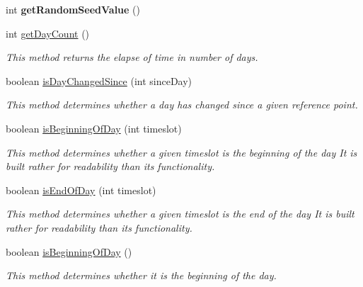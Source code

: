 \begin{DoxyCompactItemize}
\item 
\hypertarget{classuk_1_1ac_1_1dmu_1_1iesd_1_1cascade_1_1context_1_1_cascade_context_a869ae9547dcbd73deaf099fbdd07e161}{int {\bfseries get\-Random\-Seed\-Value} ()}\label{classuk_1_1ac_1_1dmu_1_1iesd_1_1cascade_1_1context_1_1_cascade_context_a869ae9547dcbd73deaf099fbdd07e161}

\item 
int \hyperlink{classuk_1_1ac_1_1dmu_1_1iesd_1_1cascade_1_1context_1_1_cascade_context_a828417cb2378423af153d968e2d0ceaa}{get\-Day\-Count} ()
\begin{DoxyCompactList}\small\item\em This method returns the elapse of time in number of days. \end{DoxyCompactList}\item 
boolean \hyperlink{classuk_1_1ac_1_1dmu_1_1iesd_1_1cascade_1_1context_1_1_cascade_context_a363a8c0ec9585e030a8f92bc61182bd1}{is\-Day\-Changed\-Since} (int since\-Day)
\begin{DoxyCompactList}\small\item\em This method determines whether a day has changed since a given reference point. \end{DoxyCompactList}\item 
boolean \hyperlink{classuk_1_1ac_1_1dmu_1_1iesd_1_1cascade_1_1context_1_1_cascade_context_a4cfc99411d50590557b39d4ece5927a4}{is\-Beginning\-Of\-Day} (int timeslot)
\begin{DoxyCompactList}\small\item\em This method determines whether a given timeslot is the beginning of the day It is built rather for readability than its functionality. \end{DoxyCompactList}\item 
boolean \hyperlink{classuk_1_1ac_1_1dmu_1_1iesd_1_1cascade_1_1context_1_1_cascade_context_a6222dc993c0db63334207250e84fd4f5}{is\-End\-Of\-Day} (int timeslot)
\begin{DoxyCompactList}\small\item\em This method determines whether a given timeslot is the end of the day It is built rather for readability than its functionality. \end{DoxyCompactList}\item 
boolean \hyperlink{classuk_1_1ac_1_1dmu_1_1iesd_1_1cascade_1_1context_1_1_cascade_context_a15052f7d6109a6c36c94df25aed2239a}{is\-Beginning\-Of\-Day} ()
\begin{DoxyCompactList}\small\item\em This method determines whether it is the beginning of the day. \end{DoxyCompactList}\item 

\end{DoxyCompactItemize}
